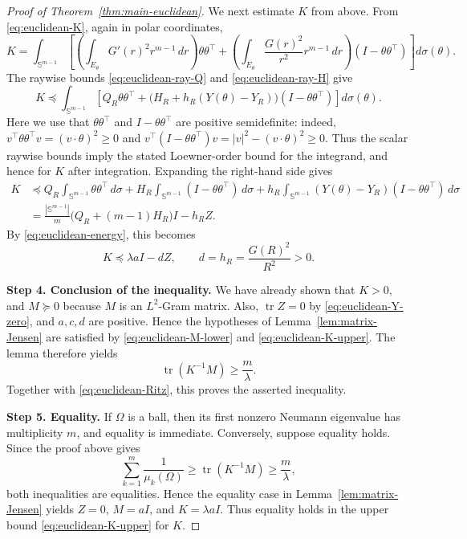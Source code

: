 \documentclass[11pt,letterpaper,reqno]{amsart}
\theoremstyle{definition}
\DeclareMathOperator{\tr}{tr}
\newcommand{\Sph}{\mathbb S}
\begin{document}
\begin{proof}[Proof of Theorem~\ref{thm:main-euclidean}]
We next estimate \(K\) from above. From \eqref{eq:euclidean-K}, again in
polar coordinates,
\begin{equation}\label{eq:K_polar_coord}
K=
\int_{\Sph^{m-1}}
        \left[
        \left(\int_{E_\theta}G'(r)^2r^{m-1}\,dr\right)\theta\theta^\top 
        +
        \left(\int_{E_\theta}\frac{G(r)^2}{r^2}r^{m-1}\,dr\right)
        (I-\theta\theta^\top )
        \right]d\sigma(\theta).
\end{equation}
The raywise bounds \eqref{eq:euclidean-ray-Q} and
\eqref{eq:euclidean-ray-H} give
\[
K
\preceq
\int_{\Sph^{m-1}}
        \left[
        Q_R\theta\theta^\top 
        +
        \bigl(H_R+h_R(Y(\theta)-Y_R)\bigr)(I-\theta\theta^\top )
        \right]d\sigma(\theta).
\]
Here we use that \(\theta\theta^\top \) and \(I-\theta\theta^\top \) are
positive semidefinite: indeed,
\(v^\top \theta\theta^\top  v=(v\cdot\theta)^2\ge0\) and
\(v^\top (I-\theta\theta^\top )v=|v|^2-(v\cdot\theta)^2\ge0\).
Thus the scalar raywise bounds imply the stated Loewner-order bound for
the integrand, and hence for \(K\) after integration. Expanding the right-hand side gives
\[
\begin{aligned}
K
&\preceq
Q_R\int_{\Sph^{m-1}}\theta\theta^\top \,d\sigma
+
H_R\int_{\Sph^{m-1}}(I-\theta\theta^\top )\,d\sigma
+
h_R\int_{\Sph^{m-1}}(Y(\theta)-Y_R)(I-\theta\theta^\top )\,d\sigma \\
&=\frac{|\Sph^{m-1}|}{m}\bigl(Q_R+(m-1)H_R\bigr)I-h_RZ.
\end{aligned}
\]
By \eqref{eq:euclidean-energy}, this becomes
\begin{equation}\label{eq:euclidean-K-upper}
        K\preceq \lambda aI-dZ,
        \qquad
        d=h_R=\frac{G(R)^2}{R^2}>0 .
\end{equation}

\medskip
\noindent\textbf{Step 4. Conclusion of the inequality.}
We have already shown that \(K>0\), and \(M\succeq0\) because \(M\) is an
\(L^2\)-Gram matrix. Also, \(\tr Z=0\) by \eqref{eq:euclidean-Y-zero}, and
\(a,c,d\) are positive. Hence the hypotheses of
Lemma~\ref{lem:matrix-Jensen} are satisfied by
\eqref{eq:euclidean-M-lower} and \eqref{eq:euclidean-K-upper}. The lemma
therefore yields
\[
        \tr(K^{-1}M)\geq \frac{m}{\lambda}.
\]
Together with \eqref{eq:euclidean-Ritz}, this proves the asserted
inequality.



\medskip
\noindent\textbf{Step 5. Equality.}
If \(\Omega\) is a ball, then its first nonzero Neumann eigenvalue has
multiplicity \(m\), and equality is immediate. Conversely, suppose equality holds. Since the proof above gives
\[
        \sum_{k=1}^m\frac1{\mu_k(\Omega)}
        \geq \tr(K^{-1}M)\geq \frac{m}{\lambda},
\]
both inequalities are equalities. Hence the equality case in
Lemma~\ref{lem:matrix-Jensen} yields \(Z=0\), \(M=aI\), and
\(K=\lambda aI\). Thus equality holds in the upper bound
\eqref{eq:euclidean-K-upper} for \(K\).




\end{proof}
\end{document}
